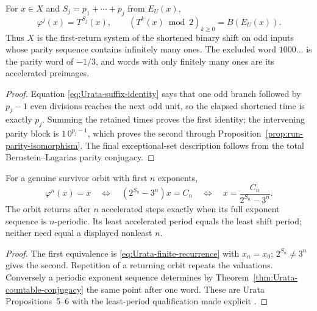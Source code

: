 \begin{proposition}
\label{prop:Urata-binary-bridge}
For $x\in X$ and $S_j=p_1+\cdots+p_j$ from
$E_U(x)$,
\begin{equation}
\label{eq:Urata-induced-times}
 \varphi^j(x)=T^{S_j}(x),
 \qquad
 (T^k(x)\bmod2)_{k\geq0}=B(E_U(x)).
\end{equation}
Thus $X$ is the first-return system of the shortened binary shift on odd
inputs whose parity sequence contains infinitely many ones.  The excluded
word $1000\ldots$ is the parity word of $-1/3$, and words with only finitely
many ones are its accelerated preimages.
\end{proposition}

\begin{proof}
Equation \eqref{eq:Urata-suffix-identity} says that one odd branch followed by
$p_j-1$ even divisions reaches the next odd unit, so the elapsed shortened
time is exactly $p_j$.  Summing the retained times proves the first identity;
the intervening parity block is $1\,0^{p_j-1}$, which proves the second through
Proposition~\ref{prop:run-parity-isomorphism}.  The final exceptional-set
description follows from the total Bernstein--Lagarias parity conjugacy.
\end{proof}

\begin{proposition}
\label{prop:Urata-periodic-exponents}
For a genuine survivor orbit with first $n$ exponents,
\begin{equation}
\label{eq:Urata-periodic-fraction}
 \varphi^n(x)=x
 \quad\Longleftrightarrow\quad
 (2^{S_n}-3^n)x=C_n
 \quad\Longleftrightarrow\quad
 x=\frac{C_n}{2^{S_n}-3^n}.
\end{equation}
The orbit returns after $n$ accelerated steps exactly when its full exponent
sequence is $n$-periodic.  Its least accelerated period equals the least shift
period; neither need equal a displayed nonleast $n$.
\end{proposition}

\begin{proof}
The first equivalence is \eqref{eq:Urata-finite-recurrence} with $x_n=x_0$;
$2^{S_n}\neq3^n$ gives the second.  Repetition of a returning orbit repeats
the valuations.  Conversely a periodic exponent sequence determines by
Theorem~\ref{thm:Urata-countable-conjugacy} the same point after one word.
These are Urata Propositions~5--6 with the least-period qualification made
explicit \cite[printed pp.~10--11]{Urata2003}.
\end{proof}

